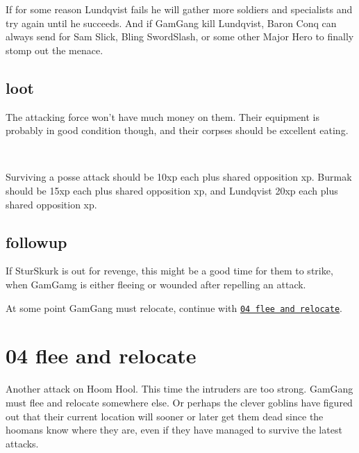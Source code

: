If for some reason Lundqvist fails he will gather more soldiers and specialists and try again until he succeeds. And if GamGang kill Lundqvist, Baron Conq can always send for Sam Slick, Bling SwordSlash, or some other Major Hero to finally stomp out the menace.


\subsection*{loot}

The attacking force won't have much money on them. Their equipment is probably in good condition though, and their corpses should be excellent eating.

\

Surviving a posse attack should be 10xp each plus shared opposition xp. Burmak should be 15xp each plus shared opposition xp, and Lundqvist 20xp each plus shared opposition xp.


\subsection*{followup}

If SturSkurk is out for revenge, this might be a good time for them to strike, when GamGamg is either fleeing or wounded after repelling an attack.

At some point GamGang must relocate, continue with 
\hyperref[04fleeandrelocate]{\texttt{04 flee and relocate}}.












\clearpage
\section*{04 flee and relocate}
\label{04fleeandrelocate}

Another attack on Hoom Hool. This time the intruders are too strong. GamGang must flee and relocate somewhere else. Or perhaps the clever goblins have figured out that their current location will sooner or later get them dead since the hoomans know where they are, even if they have managed to survive the latest attacks.


